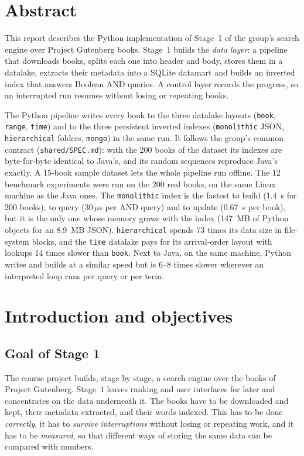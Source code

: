 \documentclass[11pt,a4paper]{article}
\newcommand{\code}[1]{\texttt{#1}}
\newcommand{\us}{\,$\mu$s}
\begin{document}
\section*{Abstract}
This report describes the Python implementation of Stage~1 of the group's search engine over
Project Gutenberg books. Stage~1 builds the \emph{data layer}: a pipeline that downloads books,
splits each one into header and body, stores them in a datalake, extracts their metadata into a
SQLite datamart and builds an inverted index that answers Boolean AND queries. A control layer
records the progress, so an interrupted run resumes without losing or repeating books.

The Python pipeline writes every book to the three datalake layouts (\code{book}, \code{range},
\code{time}) and to the three persistent inverted indexes (\code{monolithic} JSON,
\code{hierarchical} folders, \code{mongo}) in the same run. It follows the group's common contract
(\code{shared/SPEC.md}): with the 200 books of the dataset its indexes are byte-for-byte identical
to Java's, and its random sequences reproduce Java's exactly. A 15-book sample dataset lets the
whole pipeline run offline. The 12 benchmark experiments were run on the 200 real books, on the
same Linux machine as the Java ones. The \code{monolithic} index is the fastest to build (1.4~s for 200 books), to query
(30\us{} per AND query) and to update (0.67~s per book), but it is the only one whose memory grows
with the index (147~MB of Python objects for an 8.9~MB JSON). \code{hierarchical} spends 73 times its
data size in file-system blocks, and the \code{time} datalake pays for its arrival-order layout with
lookups 14 times slower than \code{book}. Next to Java, on the same machine, Python writes and
builds at a similar speed but is 6--8 times slower wherever an interpreted loop runs per query or
per term.

\tableofcontents
\newpage

\section{Introduction and objectives}

\subsection{Goal of Stage 1}
The course project builds, stage by stage, a search engine over the books of Project Gutenberg.
Stage~1 leaves ranking and user interfaces for later and concentrates on the data underneath it.
The books have to be downloaded and kept, their metadata extracted, and their words indexed. This
has to be done \emph{correctly}, it has to \emph{survive interruptions} without losing or repeating
work, and it has to be \emph{measured}, so that different ways of storing the same data can be
compared with numbers.
\end{document}
